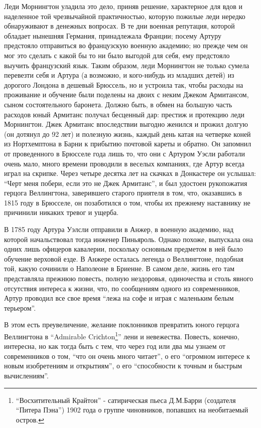 \documentclass[
  oneside,
  12pt,
  titlepage]{book}
\begin{document}
Леди Морнингтон уладила это дело, приняв решение, характерное для вдов и наделенное той чрезвычайной практичностью, которую пожилые леди нередко обнаруживают в денежных вопросах. В те дни военная репутация, которой обладает нынешняя Германия, принадлежала Франции; посему Артуру предстояло отправиться во французскую военную академию; но прежде чем он мог это сделать с какой бы то ни было выгодой для себя, ему предстояло выучить французский язык. Таким образом, леди Морнингтон не только сумела перевезти себя и Артура (а возможно, и кого-нибудь из младших детей) из дорогого Лондона в дешевый Брюссель, но и устроила так, чтобы расходы на проживание и обучение были поделены на двоих с неким Джеком Армитансом, сыном состоятельного баронета. Должно быть, в обмен на большую часть расходов юный Армитанс получал бесценный дар: престиж и протекцию леди Морнингтон. Джек Армитанс впоследствии выгодно женился и прожил долгую (он дотянул до 92 лет) и полезную жизнь, каждый день катая на четверке коней из Нортхемптона в Барни к прибытию почтовой кареты и обратно. Он запомнил от проведенного в Брюсселе года лишь то, что они с Артуром Уэсли работали очень мало, много времени проводили в веселых компаниях, где Артур всегда играл на скрипке. Через четыре десятка лет на скачках в Донкастере он услышал: ``Черт меня побери, если это не Джек Армитанс'', и был удостоен рукопожатия герцога Веллингтона, заверившего старого приятеля в том, что, оказавшись в 1815 году в Брюсселе, он позаботился о том, чтобы их прежнему наставнику не причинили никаких тревог и ущерба.

В 1785 году Артура Уэлсли отправили в Анжер, в военную академию, над которой начальствовал тогда инженер Пиньяроль. Однако похоже, выпускала она одних лишь офицеров кавалерии, поскольку основным предметом в ней было обучение верховой езде. В Анжере осталась легенда о Веллингтоне, подобная той, какую сочинили о Наполеоне в Бриенне. В самом деле, жизнь его там представляла прежнюю повесть, полную нездоровья, одиночества и столь явного отсутствия интереса к жизни, что, по сообщениям одного из современников, Артур проводил все свое время ``лежа на софе и играя с маленьким белым терьером''.

В этом есть преувеличение, желание поклонников превратить юного герцога Веллингтона в ``Admirable Criсhton\footnote{``Восхитительный Крайтон'' - сатирическая пьеса Д.М.Барри (создателя ``Питера Пэна'') 1902 года о группе чиновников, попавших на необитаемый остров.}'' лени и невежества. Повесть, конечно, интересна, но как тогда быть с тем, что через год или два мы узнаем от современников о том, ``что он очень много читает'', о его ``огромном интересе к новым изобретениям и открытиям'', о его ``способности к точным и быстрым вычислениям''.
\end{document}
